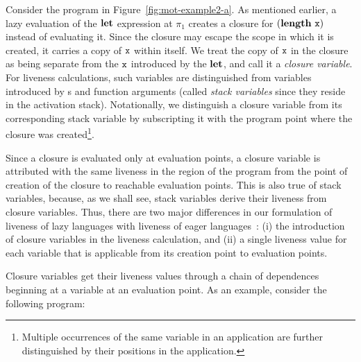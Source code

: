 \documentclass[preprint, 9pt]{sigplanconf}
\begin{document}
Consider the  program in Figure~\ref{fig:mot-example2-a}.   As mentioned
earlier, a lazy evaluation of the $\mbox{$\mathbf{ let}$}$ expression at $\pi_1$ creates
a closure  for $(\mathbf{length}~\mbox{\tt x})$  instead of  evaluating it.   Since the
closure may escape the scope in which it is created, it carries a copy
of $\mbox{\tt x}$ within itself.  We treat the  copy of $\mbox{\tt x}$ in the closure as
being separate from the $\mbox{\tt x}$ introduced  by the $\mbox{$\mathbf{ let}$}$, and call it a
\emph{closure  variable}.  For  liveness calculations,  such variables
are distinguished  from variables  introduced by  \LET s  and function
arguments  (called \emph{stack  variables}  since they  reside in  the
activation  stack). Notationally,  we distinguish  a closure  variable
from  its corresponding  stack variable  by subscripting  it with  the
program   point  where   the   closure  was   created\footnote{Multiple
  occurrences  of the  same  variable in  an  application are  further
  distinguished by their positions in the application.}.


  Since a  closure is evaluated  only at evaluation points,  a closure
  variable is attributed  with the same liveness in the  region of the
  program  from the  point of  creation  of the  closure to  reachable
  evaluation points.  This  is also true of  stack variables, because,
  as we shall see, stack  variables derive their liveness from closure
  variables. Thus, there are two  major differences in our formulation
  of   liveness   of   lazy   languages   with   liveness   of   eager
  languages~\cite{asati14lgc}:   (i)  the   introduction  of   closure
  variables in  the liveness calculation,  and (ii) a  single liveness
  value for each  variable that is applicable from  its creation point
  to evaluation points.


  Closure  variables get  their  liveness values  through  a chain  of
  dependences beginning at  a variable at an evaluation  point.  As an
  example, consider the following program:


  
\end{document}
